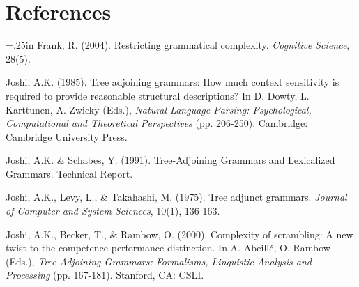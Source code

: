 \documentclass[12pt]{article}
\makeatletter
\newcommand{\hangpara}[2]{\hangindent#1\hangafter#2\noindent}
\newenvironment{hangparas}[2]{\setlength{\parindent}{\z@}%
  \everypar={\hangpara{#1}{#2}}}{\par}
\makeatother
\begin{document}
\section*{References}

\begin{hangparas}{.25in}{1}
\small
Frank, R. (2004). Restricting grammatical complexity. \textit{Cognitive Science}, 28(5).

Joshi, A.K. (1985). Tree adjoining grammars: How much context sensitivity is required to provide reasonable structural descriptions? In D. Dowty, L. Karttunen, A. Zwicky (Eds.), \textit{Natural Language Parsing: Psychological, Computational and Theoretical Perspectives} (pp. 206-250). Cambridge: Cambridge University Press.

Joshi, A.K. \& Schabes, Y. (1991). Tree-Adjoining Grammars and Lexicalized Grammars. Technical Report.

Joshi, A.K., Levy, L., \& Takahashi, M. (1975). Tree adjunct grammars. \textit{Journal of Computer and System Sciences}, 10(1), 136-163.

Joshi, A.K., Becker, T., \& Rambow, O. (2000). Complexity of scrambling: A new twist to the competence-performance distinction. In A. Abeill\'{e}, O. Rambow (Eds.), \textit{Tree Adjoining Grammars: Formalisms, Linguistic Analysis and Processing} (pp. 167-181). Stanford, CA: CSLI.
\end{hangparas}
\end{document}
